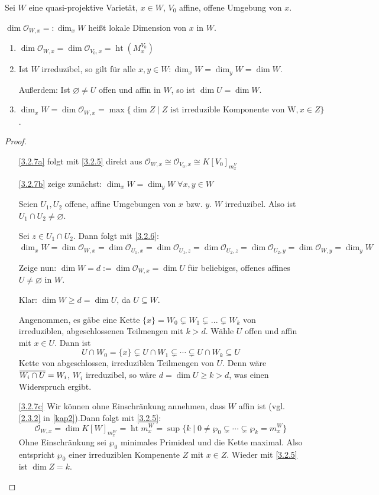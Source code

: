 \documentclass[a4paper,12pt]{scrbook}
\theoremstyle{keinenummern} %
\theoremstyle{mitnummern}
\theoremstyle{unserbeweis}
\newtheorem{proof}{Beweis}
\def\O{\mathcal{O}}
\newcommand{\hoehe}{\operatorname{ht}}
\newcommand{\leer}{\ensuremath{\varnothing}}
\renewcommand{\dotsc}{\ensuremath{\!...}}
\def\Bar#1{\ensuremath\overline{#1}}
\begin{document}
\begin{prop}\label{3.2.7} 
Sei $W$ eine quasi-projektive Varietät, $x\in W$, $V_0$ affine, offene Umgebung von $x$.

$\dim \O_{W,x}=:\dim_x W$ heißt lokale Dimension von $x$ in $W$.
  \begin{enumerate}
  \item{} $\dim \O_{W,x}=\dim \O_{V_0,x}=\hoehe(M_x^{V_0})$
  \item{} Ist $W$ irreduzibel, so gilt für alle $x,y \in W: \dim_x W=\dim_y W=\dim W$.

  Außerdem: Ist $\leer \neq U$ offen und affin in $W$, so ist $\dim U=\dim W$.
  \item{} $\dim_x W=\dim \O_{W,x}=\max\{\dim Z \mid Z \text{ ist irreduzible Komponente von W},x\in Z\}$.
  \end{enumerate}
\end{prop}

\begin{proof}
  \begin{enumerate}
  \item[\ref{3.2.7a}] folgt mit \cref{3.2.5} direkt aus $\O_{W,x}\cong \O_{V_0,x}\cong K[V_0]_{m_x^V}$
  \item[\ref{3.2.7b}] zeige zunächst: $\dim_x W=\dim_y W \; \forall x,y \in W$
  
  Seien $U_1,U_2$ offene, affine Umgebungen von $x$ bzw. $y$. $W$ irreduzibel. Also ist $U_1\cap U_2\neq \leer$.  

  Sei $z\in U_1\cap U_2$. Dann folgt mit \cref{3.2.6}: $\dim_x W=\dim \O_{W,x}=\dim \O_{U_1,x}=\dim \O_{U_1,z}=\dim \O_{U_2,z}=\dim \O_{U_2,y}=\dim \O_{W,y}=\dim_y W$

Zeige nun: $\dim W=d:=\dim \O_{W,x}=\dim U$ für beliebiges, offenes affines $U\neq \leer$ in $W$.

Klar: $\dim W\ge d=\dim U$, da $U\subseteq W$. 

Angenommen, es gäbe eine Kette $\{x\}=W_0 \varsubsetneq W_1 \varsubsetneq \dotsc \varsubsetneq W_k$ von irreduziblen, abgeschlossenen Teilmengen mit $k>d$. Wähle $U$ offen und affin mit $x\in U$. Dann ist 
\[U\cap W_0=\{x\} \varsubsetneq U\cap W_1 \varsubsetneq \dotsm \varsubsetneq U\cap W_k\subseteq U\]
Kette von abgeschlossen, irreduziblen Teilmengen von $U$. Denn wäre $\Bar{W_i\cap U}=W_i$, $W_i$ irreduzibel, so wäre $d=\dim U\ge k>d$, was einen Widerspruch ergibt.
  \item[\ref{3.2.7c}] Wir können ohne Einschränkung annehmen, dass $W$ affin ist (vgl. \cref{2.3.2} in \cref{kap2}).Dann folgt mit \cref{3.2.5}:
\[\O_{W,x}=\dim K[W]_{m_x^W}=\hoehe m_x^W=\sup \{k \mid 0\neq \wp_0 \varsubsetneq \dotsm \varsubsetneq \wp_k=m_x^W\}\]
Ohne Einschränkung sei $\wp_0$ minimales Primideal und die Kette maximal. Also entspricht $\wp_0$ einer irreduziblen Kompenente $Z$ mit $x\in Z$. Wieder mit \cref{3.2.5} ist $\dim Z=k$.
  \end{enumerate}
\end{proof}
\end{document}
